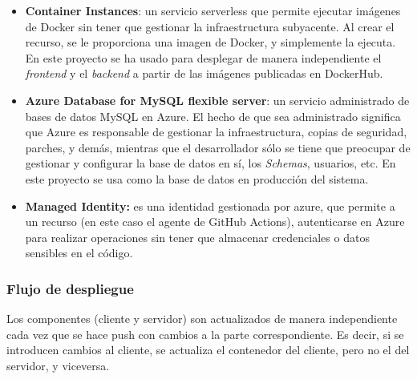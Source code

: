 \begin{itemize}
    \item \textbf{Container Instances}: un servicio serverless que permite ejecutar imágenes de Docker sin tener que gestionar la infraestructura subyacente. Al crear el recurso, se le proporciona una imagen de Docker, y simplemente la ejecuta. En este proyecto se ha usado para desplegar de manera independiente el \textit{frontend} y el \textit{backend} a partir de las imágenes publicadas en DockerHub.
    \item \textbf{Azure Database for MySQL flexible server}: un servicio administrado de bases de datos MySQL en Azure. El hecho de que sea administrado significa que Azure es responsable de gestionar la infraestructura, copias de seguridad, parches, y demás, mientras que el desarrollador sólo se tiene que preocupar de gestionar y configurar la base de datos en sí, los \textit{Schemas}, usuarios, etc. En este proyecto se usa como la base de datos en producción del sistema.
    \item \textbf{Managed Identity:} es una identidad gestionada por azure, que permite a un recurso (en este caso el agente de GitHub Actions), autenticarse en Azure para realizar operaciones sin tener que almacenar credenciales o datos sensibles en el código.
\end{itemize}

\subsubsection{Flujo de despliegue}
Los componentes (cliente y servidor) son actualizados de manera independiente cada vez que se hace push con cambios a la parte correspondiente. Es decir, si se introducen cambios al cliente, se actualiza el contenedor del cliente, pero no el del servidor, y viceversa.

